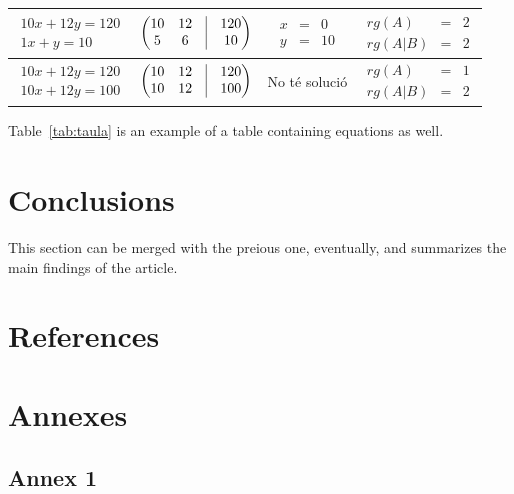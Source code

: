 \documentclass[12pt,twoside]{article}
\begin{document}
\begin{table}
\begin{tabular}{|c|c|c|c|}
    \\
    \hline
    $\begin{array}{c}10x+12y=120\\1x+y=10\end{array}$&
    $\begin{pmatrix}10&12&\vrule&120\\5&6&\vrule&10\end{pmatrix}$&
    $\begin{array}{rcl}x&=&0\\y&=&10\end{array}$&
    $\begin{array}{rcl}rg(A)&=&2\\rg(A|B)&=&2\end{array}$
    \\
    \hline
    $\begin{array}{c}10x+12y=120\\10x+12y=100\end{array}$&
    $\begin{pmatrix}10&12&\vrule&120\\10&12&\vrule&100\end{pmatrix}$&
    No té solució&
    $\begin{array}{rcl}rg(A)&=&1\\rg(A|B)&=&2\end{array}$
    \\
    \hline
  \end{tabular}


\end{table}
Table~\ref{tab:taula} is an example of a table containing equations as well.

\clearpage
\section{Conclusions}

This section can be merged with the preious one, eventually, and summarizes the main findings of the article.


\clearpage
\section{References}

\clearpage




\section{Annexes}
\subsection{Annex 1}
\end{document}
